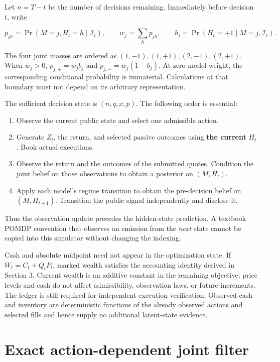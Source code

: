 \documentclass[10pt,a4paper]{article}
\begin{document}
Let $n=T-t$ be the number of decisions remaining. Immediately before decision
$t$, write

\begin{equation*}
p_{jh}=\Pr(M=j,H_t=h\mid\mathcal I_t),\qquad
w_j=\sum_h p_{jh},\qquad
b_j=\Pr(H_t=+1\mid M=j,\mathcal I_t).
\end{equation*}

The four joint masses are ordered as
$(1,-1),(1,+1),(2,-1),(2,+1)$. When $w_j>0$,
$p_{j,+}=w_jb_j$ and $p_{j,-}=w_j(1-b_j)$. At zero model weight,
the corresponding conditional probability is immaterial. Calculations at that
boundary must not depend on its arbitrary representation.

The sufficient decision state is $(n,q,x,p)$. The following order is essential:

\begin{enumerate}
\item Observe the current public state and select one admissible action.
\item Generate $Z_t$, the return, and selected passive outcomes using \textbf{the
   current} $H_t$. Book actual executions.
\item Observe the return and the outcomes of the submitted quotes. Condition the
   joint belief on those observations to obtain a posterior on $(M,H_t)$.
\item Apply each model's regime transition to obtain the pre-decision belief on
   $(M,H_{t+1})$. Transition the public signal independently and disclose it.
\end{enumerate}

Thus the observation update precedes the hidden-state prediction. A textbook
POMDP convention that observes an emission from the \emph{next} state cannot be
copied into this simulator without changing the indexing.

Cash and absolute midpoint need not appear in the optimization state. If
$W_t=C_t+Q_tP_t$, marked wealth satisfies the accounting identity derived in
Section 3. Current wealth is an additive constant in the remaining objective;
price levels and cash do not affect admissibility, observation laws, or future
increments. The ledger is still required for independent execution verification.
Observed cash and inventory are deterministic functions of the already observed
actions and selected fills and hence supply no additional latent-state evidence.

\section{Exact action-dependent joint filter}
\end{document}
